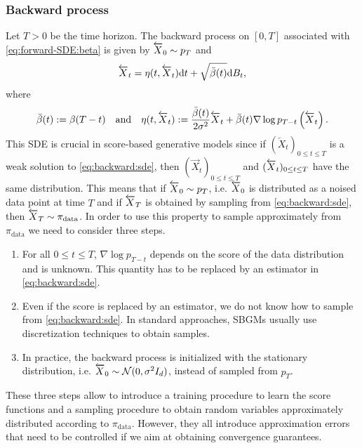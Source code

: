 \documentclass[english,graybox,envcountchap,envcountsame,sectrefs,shortlabels]{svmono}
\theoremstyle{style}
\newcommand{\eqsp}{}
\begin{document}
\subsubsection*{Backward process}
Let $T>0$ be the time horizon. The backward process on $[0,T]$ associated with \eqref{eq:forward-SDE:beta} is given by $\overleftarrow X_0 \sim p_T$ and
\begin{equation}
\label{eq:backward:sde}
\overleftarrow{X}_t  =\eta(t,\overleftarrow{X}_t)\rmd t +   \sqrt{\bar \sched(t)} \rmd B_t\eqsp,
\end{equation}
where
$$
\bar \sched(t) \eqdef \sched(T- t) \quad\mbox{and}\quad\eta(t,\overleftarrow{X}_t) \eqdef \frac{\bar \sched (t)}{2\sigma^2}\overleftarrow{X}_t + \bar \sched (t) \nabla \log  p_{T-t}\left( \ola{X}_t \right)\eqsp.
$$
This SDE is crucial in score-based generative models since if $(\overleftarrow{X}_t)_{0\leq t \leq T}$ is a weak solution to \eqref{eq:backward:sde}, then $(\overrightarrow{X}_{t})_{0\leq t \leq T}$ and $(\overleftarrow{X}_{t})_{0\leq t \leq T}$ have the same distribution. This means that if $\overleftarrow X_0 \sim p_T$, i.e. $\overleftarrow X_0$ is distributed as a noised data point at time $T$ and if $\overleftarrow X_T$ is obtained by sampling from \eqref{eq:backward:sde}, then $\overleftarrow X_T\sim\pi_{\mathrm{data}}$. In order to use this property to sample approximately from $\pi_{\mathrm{data}}$ we need to consider three steps.
\begin{enumerate}
\item For all $0\leq t\leq T$, $ \nabla \log  p_{T-t}$ depends on the score of the data distribution and is unknown. This quantity has to be replaced by an estimator in \eqref{eq:backward:sde}.
\item Even if the score is replaced by an estimator, we do not know how to sample from \eqref{eq:backward:sde}. In standard approaches, SBGMs usually use discretization techniques to obtain samples.
\item In practice, the backward process is initialized with the stationary distribution, i.e.  $\overleftarrow X_0 \sim \mathcal{N}(0,\sigma^2 I_d)$, instead of sampled from $p_T$.
\end{enumerate}
These three steps allow to introduce a training procedure to learn the score functions and a sampling procedure to obtain random variables approximately distributed according to $\pi_{\mathrm{data}}$. However, they all introduce approximation errors that need to be controlled if we aim at obtaining convergence guarantees.
\end{document}
